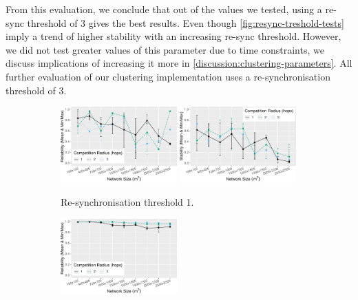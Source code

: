 From this evaluation, we conclude that out of the values we tested, using a re-sync threshold of 3 gives the best results. Even though \cref{fig:resync-treshold-tests} imply a trend of higher stability with an increasing re-sync threshold. However, we did not test greater values of this parameter due to time constraints, we discuss implications of increasing it more in \cref{discussion:clustering-parameters}. All further evaluation of our clustering implementation uses a re-synchronisation threshold of 3.

\begin{figure}[H]
\centering
\begin{subfigure}{\textwidth}
    \centering
    \includegraphics[width=0.49\textwidth, keepaspectratio]{figure/Results/ParameterEvaluation/ResyncThreshold1_Reliability.pdf}
    \includegraphics[width=0.49\textwidth, keepaspectratio]{figure/Results/ParameterEvaluation/ResyncThreshold1_Stability.pdf}
    \caption{Re-synchronisation threshold 1.}
    \label{subfig:resync-treshold-1}
\end{subfigure}
\begin{subfigure}{\textwidth}
    \centering
    \includegraphics[width=0.49\textwidth, keepaspectratio]{figure/Results/ParameterEvaluation/ResyncThreshold2_Reliability.pdf}

\end{subfigure}
\end{figure}
